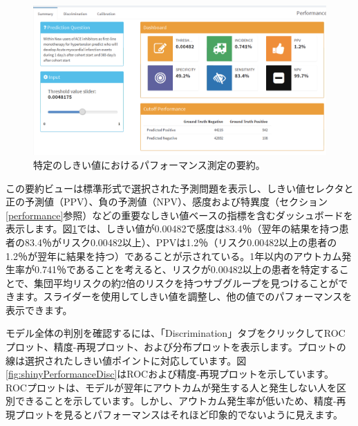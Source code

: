 \documentclass[
  11pt]{book}
\theoremstyle{definition}
\theoremstyle{definition}
\theoremstyle{definition}
\theoremstyle{definition}
\theoremstyle{remark}
\begin{document}
\begin{figure}

{\centering \includegraphics[width=1\linewidth]{images/PatientLevelPrediction/shiny/shinyPerformanceSum} 

}

\caption{特定のしきい値におけるパフォーマンス測定の要約。}\label{fig:shinyPerformanceSum}
\end{figure}

この要約ビューは標準形式で選択された予測問題を表示し、しきい値セレクタと正の予測値（PPV）、負の予測値（NPV）、感度および特異度（セクション\ref{performance}参照）などの重要なしきい値ベースの指標を含むダッシュボードを表示します。図\ref{fig:shinyPerformanceSum}では、しきい値が0.00482で感度は83.4％（翌年の結果を持つ患者の83.4％がリスク0.00482以上）、PPVは1.2％（リスク0.00482以上の患者の1.2％が翌年に結果を持つ）であることが示されている。1年以内のアウトカム発生率が0.741％であることを考えると、リスクが0.00482以上の患者を特定することで、集団平均リスクの約2倍のリスクを持つサブグループを見つけることができます。スライダーを使用してしきい値を調整し、他の値でのパフォーマンスを表示できます。

モデル全体の判別を確認するには、「Discrimination」タブをクリックしてROCプロット、精度-再現プロット、および分布プロットを表示します。プロットの線は選択されたしきい値ポイントに対応しています。図\ref{fig:shinyPerformanceDisc}はROCおよび精度-再現プロットを示しています。ROCプロットは、モデルが翌年にアウトカムが発生する人と発生しない人を区別できることを示しています。しかし、アウトカム発生率が低いため、精度-再現プロットを見るとパフォーマンスはそれほど印象的でないように見えます。
\end{document}
